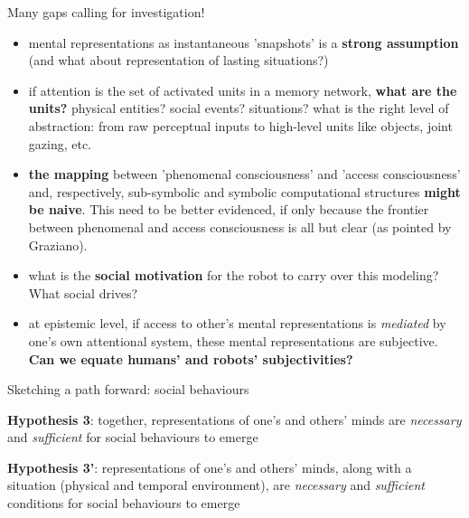 \documentclass[compress]{beamer}
\begin{document}

\begin{frame}{Many gaps calling for investigation!}

\footnotesize
    \begin{itemize}

        \item<+-> mental representations as instantaneous 'snapshots' is a {\bf strong
            assumption} (and what about representation of lasting situations?)

        \item<+-> if attention is the set of activated units in a memory network,
            {\bf what are the units?} physical entities? social events? situations?
            what is the right level of abstraction: from raw perceptual inputs to
            high-level units like objects, joint gazing, etc.


        \item<+-> {\bf the mapping} between 'phenomenal consciousness' and
            'access consciousness' and, respectively, sub-symbolic and symbolic
            computational structures {\bf might be naive}. This need to be
            better evidenced, if only because the frontier between phenomenal
            and access consciousness is all but clear (as pointed by Graziano).

        \item<+-> what is the {\bf social motivation} for the robot to carry
            over this modeling? What social drives?

        \item<+-> at epistemic level, if access to other's mental
            representations is \emph{mediated} by one's own attentional system,
            these mental representations are subjective. {\bf Can we equate humans'
            and robots' subjectivities?}

    \end{itemize}

\end{frame}


\begin{frame}{Sketching a path forward: social behaviours}

    {\bf Hypothesis 3}: together, representations of one's and others' minds are
    \emph{necessary} and \emph{sufficient} for social behaviours to emerge

    {\bf Hypothesis 3'}: representations of one's and others' minds, along with
    a situation (physical and temporal environment), are \emph{necessary} and
    \emph{sufficient} conditions for social behaviours to emerge

    \pause

\end{frame}
\end{document}
